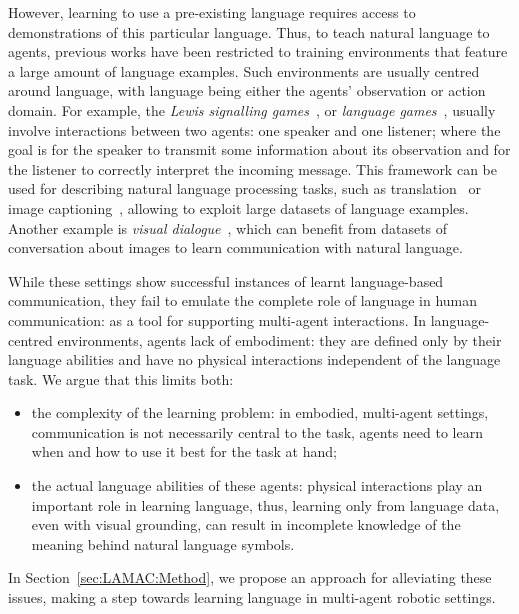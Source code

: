 However, learning to use a pre-existing language requires access to demonstrations of this particular language. Thus, to teach natural language to agents, previous works have been restricted to training environments that feature a large amount of language examples. Such environments are usually centred around language, with language being either the agents' observation or action domain. 
For example, the \textit{Lewis signalling games}~\citep{Lewis1969_Convention}, or \textit{language games}~\citep{Steels1995_SelfOrgVoc, Steels2000_AIBO}, usually involve interactions between two agents: one speaker and one listener; where the goal is for the speaker to transmit some information about its observation and for the listener to correctly interpret the incoming message. This framework can be used for describing natural language processing tasks, such as translation~\citep{Lee2018_EmergentTranslation, Lee2019_CounteringLDrift, Lu2020_CounterLangDrift} or image captioning~\citep{Lee2019_CounteringLDrift, Lazaridou2020_MACNatLang, Gupta2021_DynamicPop}, allowing to exploit large datasets of language examples. 
Another example is \textit{visual dialogue}~\citep{Das2017_CoopVisDial, Agarwal2019_CommunityRegul}, which can benefit from datasets of conversation about images to learn communication with natural language.

While these settings show successful instances of learnt language-based communication, they fail to emulate the complete role of language in human communication: as a tool for supporting multi-agent interactions. In language-centred environments, agents lack of embodiment: they are defined only by their language abilities and have no physical interactions independent of the language task. We argue that this limits both:
\begin{itemize}
    \item the complexity of the learning problem: in embodied, multi-agent settings, communication is not necessarily central to the task, agents need to learn when and how to use it best for the task at hand;
    \item the actual language abilities of these agents: physical interactions play an important role in learning language, thus, learning only from language data, even with visual grounding, can result in incomplete knowledge of the meaning behind natural language symbols. 
\end{itemize}
In Section~\ref{sec:LAMAC:Method}, we propose an approach for alleviating these issues, making a step towards learning language in multi-agent robotic settings. 

